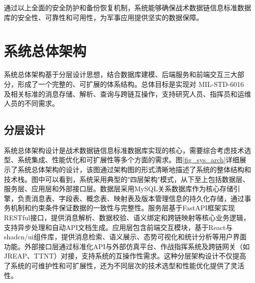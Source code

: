 通过以上全面的安全防护和备份恢复机制，系统能够确保战术数据链信息标准数据库的安全性、可靠性和可用性，为军事应用提供坚实的数据保障。

\section{系统总体架构}

系统总体架构基于分层设计思想，结合数据库建模、后端服务和前端交互三大部分，形成了一个完整的、可扩展的体系结构。总体目标是实现对 {MIL-STD-6016} 及相关标准的消息存储、解析、查询与跨链互操作，支持研究人员、指挥员和运维人员的不同需求。

\subsection{分层设计}
系统总体架构设计是战术数据链信息标准数据库实现的核心，需要综合考虑技术选型、系统集成、性能优化和可扩展性等多个方面的需求。图\ref{fig_sys_arch}详细展示了系统总体架构的设计，该图通过架构图的形式清晰地描述了系统的整体结构和技术栈。图中可以看到，系统采用典型的"四层架构"模式，从下至上包括数据层、服务层、应用层和外部接口层。数据层采用MySQL关系数据库作为核心存储引擎，负责消息表、字段表、概念表、映射表及版本管理信息的持久化存储，通过事务机制和约束条件保证数据的一致性与完整性。服务层基于FastAPI框架实现RESTful接口，提供消息解析、数据校验、语义绑定和跨链映射等核心业务逻辑，支持异步处理和自动API文档生成。应用层包含前端交互模块，基于React与shadcn/ui组件库，提供消息检索、语义展示、态势可视化和统计分析等用户界面功能。外部接口层通过标准化API与外部仿真平台、作战指挥系统及跨链网关（如JREAP、TTNT）对接，支持系统的互操作性需求。这种分层架构设计不仅提高了系统的可维护性和可扩展性，还为不同层次的技术选型和性能优化提供了灵活性。

